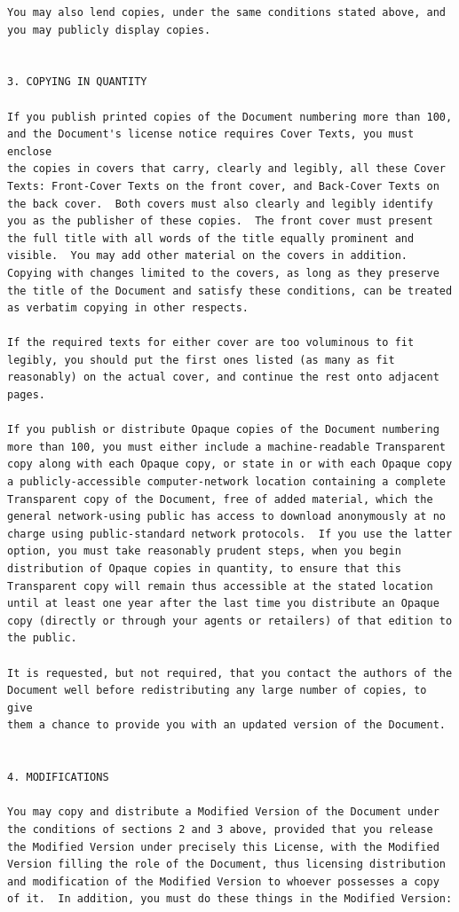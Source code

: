 \documentclass[12pt]{report}
\begin{document}
\begin{verbatim}
You may also lend copies, under the same conditions stated above, and
you may publicly display copies.


3. COPYING IN QUANTITY

If you publish printed copies of the Document numbering more than 100,
and the Document's license notice requires Cover Texts, you must enclose
the copies in covers that carry, clearly and legibly, all these Cover
Texts: Front-Cover Texts on the front cover, and Back-Cover Texts on
the back cover.  Both covers must also clearly and legibly identify
you as the publisher of these copies.  The front cover must present
the full title with all words of the title equally prominent and
visible.  You may add other material on the covers in addition.
Copying with changes limited to the covers, as long as they preserve
the title of the Document and satisfy these conditions, can be treated
as verbatim copying in other respects.

If the required texts for either cover are too voluminous to fit
legibly, you should put the first ones listed (as many as fit
reasonably) on the actual cover, and continue the rest onto adjacent
pages.

If you publish or distribute Opaque copies of the Document numbering
more than 100, you must either include a machine-readable Transparent
copy along with each Opaque copy, or state in or with each Opaque copy
a publicly-accessible computer-network location containing a complete
Transparent copy of the Document, free of added material, which the
general network-using public has access to download anonymously at no
charge using public-standard network protocols.  If you use the latter
option, you must take reasonably prudent steps, when you begin
distribution of Opaque copies in quantity, to ensure that this
Transparent copy will remain thus accessible at the stated location
until at least one year after the last time you distribute an Opaque
copy (directly or through your agents or retailers) of that edition to
the public.

It is requested, but not required, that you contact the authors of the
Document well before redistributing any large number of copies, to give
them a chance to provide you with an updated version of the Document.


4. MODIFICATIONS

You may copy and distribute a Modified Version of the Document under
the conditions of sections 2 and 3 above, provided that you release
the Modified Version under precisely this License, with the Modified
Version filling the role of the Document, thus licensing distribution
and modification of the Modified Version to whoever possesses a copy
of it.  In addition, you must do these things in the Modified Version:


\end{verbatim}
\end{document}
